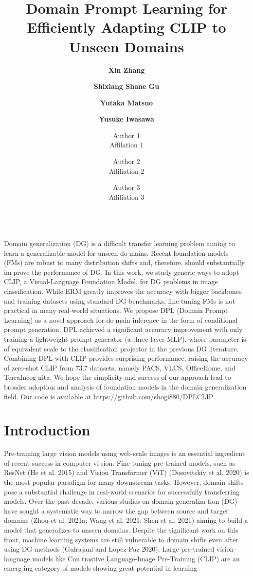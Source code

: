 \documentclass{article}
\title{\huge \textbf{Domain Prompt Learning for Efficiently Adapting CLIP to Unseen Domains}\\

}
\author[1]{\textbf{ Xin Zhang}}
\author[1,2]{\textbf{Shixiang Shane Gu} }
\author[1]{\textbf{Yutaka Matsuo}}
\author[1]{\textbf{Yusuke Iwasawa}}
\author{%
  Author 1\\Affilation 1
  \and Author 2\\Affiliation 2
  \and Author 3\\Affiliation 3
 
}
\affil[1]{The University of Tokyo}
\affil[2]{Google Research, Brain Team}
\date{}
\renewenvironment{abstract}
 {\par\noindent\textbf{\abstractname}\ \ignorespaces}
 {\par\medskip}
\begin{document}
\maketitle



\begin{multicols}{2}

\begin{abstract}
\\Domain generalization (DG) is a difficult transfer learning
problem aiming to learn a generalizable model for unseen domains. Recent foundation models (FMs) are robust to many
distribution shifts and, therefore, should substantially improve the performance of DG. In this work, we study generic
ways to adopt CLIP, a Visual-Language Foundation Model,
for DG problems in image classification. While ERM greatly
improves the accuracy with bigger backbones and training
datasets using standard DG benchmarks, fine-tuning FMs
is not practical in many real-world situations. We propose
DPL (Domain Prompt Learning) as a novel approach for domain inference in the form of conditional prompt generation.
DPL achieved a significant accuracy improvement with only
training a lightweight prompt generator (a three-layer MLP),
whose parameter is of equivalent scale to the classification
projector in the previous DG literature. Combining DPL with
CLIP provides surprising performance, raising the accuracy
of zero-shot CLIP from 73.7%
datasets, namely PACS, VLCS, OfficeHome, and TerraIncognita. We hope the simplicity and success of our approach
lead to broader adoption and analysis of foundation models
in the domain generalization field. Our code is available at
https://github.com/shogi880/DPLCLIP
\end{abstract}

\section{\centering Introduction}

Pre-training large vision models using web-scale images is
an essential ingredient of recent success in computer vision. Fine-tuning pre-trained models, such as ResNet (He
et al. 2015) and Vision Transformer (ViT) (Dosovitskiy et al.
2020) is the most popular paradigm for many downstream
tasks. However, domain shifts pose a substantial challenge
in real-world scenarios for successfully transferring models.
Over the past decade, various studies on domain generalization (DG) have sought a systematic way to narrow the gap
between source and target domains (Zhou et al. 2021a; Wang
et al. 2021; Shen et al. 2021) aiming to build a model that
generalizes to unseen domains. Despite the significant work
on this front, machine learning systems are still vulnerable
to domain shifts even after using DG methods (Gulrajani and
Lopez-Paz 2020).
Large pre-trained vision-language models like Contrastive Language-Image Pre-Training (CLIP) are an emerging category of models showing great potential in learning


\end{multicols}
\end{document}
